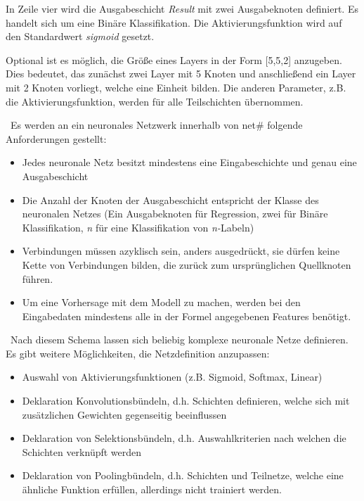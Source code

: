 In Zeile vier wird die Ausgabeschicht \textit{Result} mit zwei Ausgabeknoten definiert. Es handelt sich um eine Binäre Klassifikation. Die Aktivierungsfunktion wird auf den Standardwert \textit{sigmoid} gesetzt. 

Optional ist es möglich, die Größe eines Layers in der Form [5,5,2] anzugeben. Dies bedeutet, das zunächst zwei Layer mit 5 Knoten und anschließend ein Layer mit 2 Knoten vorliegt, welche eine Einheit bilden. Die anderen Parameter, z.B. die Aktivierungsfunktion, werden für alle Teilschichten übernommen.

~\newline Es werden an ein neuronales Netzwerk innerhalb von net\# folgende Anforderungen gestellt:

\begin{itemize}
	\item Jedes neuronale Netz besitzt mindestens eine Eingabeschichte und genau eine Ausgabeschicht
	\item Die Anzahl der Knoten der Ausgabeschicht entspricht der Klasse des neuronalen Netzes (Ein Ausgabeknoten für Regression, zwei für Binäre Klassifikation, \textit{n} für eine Klassifikation von \textit{n-}Labeln)
	\item Verbindungen müssen azyklisch sein, anders ausgedrückt, sie dürfen keine Kette von Verbindungen bilden, die zurück zum ursprünglichen Quellknoten führen.
	\item Um eine Vorhersage mit dem Modell zu machen, werden bei den Eingabedaten mindestens alle in der Formel angegebenen Features benötigt. 
\end{itemize}

~\newline Nach diesem Schema lassen sich beliebig komplexe neuronale Netze definieren. Es gibt weitere Möglichkeiten, die Netzdefinition anzupassen:

\begin{itemize}
	\item Auswahl von Aktivierungsfunktionen (z.B. Sigmoid, Softmax, Linear)
	\item Deklaration Konvolutionsbündeln, d.h. Schichten definieren, welche sich mit zusätzlichen Gewichten gegenseitig beeinflussen
	\item Deklaration von Selektionsbündeln, d.h. Auswahlkriterien nach welchen die Schichten verknüpft werden
	\item Deklaration von Poolingbündeln, d.h. Schichten und Teilnetze, welche eine ähnliche Funktion erfüllen, allerdings nicht trainiert werden. 
\end{itemize} 

